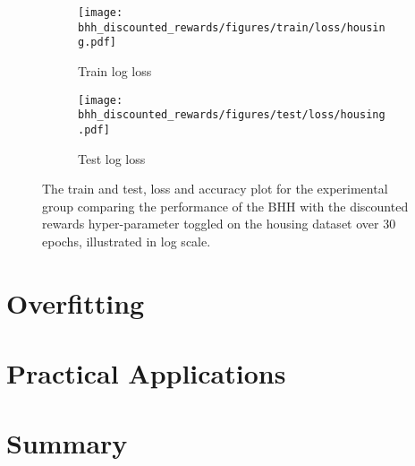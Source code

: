 \begin{figure}[htbp]
	\begin{subfigure}{0.5\textwidth}
		\centering
		\texttt{[image: bhh\_discounted\_rewards/figures/train/loss/housing.pdf]}
		\caption{Train log loss}
		\label{fig:results:discounted_rewards:figures:loss:train:housing}
	\end{subfigure}
	\begin{subfigure}{0.5\textwidth}
		\centering
		\texttt{[image: bhh\_discounted\_rewards/figures/test/loss/housing.pdf]}
		\caption{Test log loss}
		\label{fig:results:discounted_rewards:figures:loss:test:housing}
	\end{subfigure}
	\par\bigskip
	\caption{The train and test, loss and accuracy plot for the experimental group comparing the performance of the \acs{BHH} with the discounted rewards hyper-parameter toggled on the housing dataset over 30 epochs, illustrated in log scale.}
	\label{fig:results:discounted_rewards:figures:housing}
\end{figure}

\section{Overfitting}\label{sec:results:overfitting}

\section{Practical Applications}\label{sec:results:practical_applications}

\section{Summary}\label{sec:results:summary}